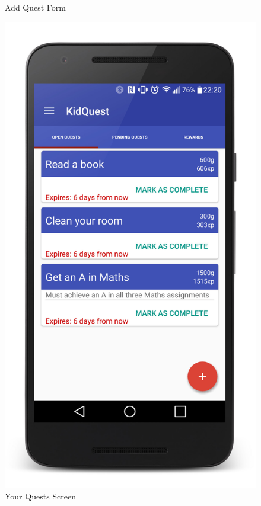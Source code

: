 \begin{figure}[ht]
\begin{minipage}[b]{0.45\linewidth}
    \caption{Add Quest Form} 
    \vspace{4ex}
  \end{minipage}%
  \begin{minipage}[b]{0.45\linewidth}
    \centering
    \includegraphics[width=.6\linewidth]{../images/Screenshot/YourQuestsScreen.jpg}
    \caption{Your Quests Screen} 
    \vspace{4ex}
  \end{minipage} 
\end{figure}

